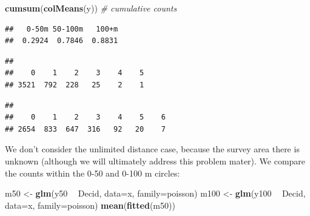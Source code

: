 \documentclass[12pt,]{book}
\newenvironment{Shaded}{\begin{snugshade}}{\end{snugshade}}
\newcommand{\CommentTok}[1]{\textcolor[rgb]{0.56,0.35,0.01}{\textit{#1}}}
\newcommand{\DataTypeTok}[1]{\textcolor[rgb]{0.13,0.29,0.53}{#1}}
\newcommand{\KeywordTok}[1]{\textcolor[rgb]{0.13,0.29,0.53}{\textbf{#1}}}
\newcommand{\NormalTok}[1]{#1}
\newcommand{\OperatorTok}[1]{\textcolor[rgb]{0.81,0.36,0.00}{\textbf{#1}}}
\newcommand{\StringTok}[1]{\textcolor[rgb]{0.31,0.60,0.02}{#1}}
\begin{document}
\begin{Shaded}
\begin{Highlighting}[]
\KeywordTok{cumsum}\NormalTok{(}\KeywordTok{colMeans}\NormalTok{(y)) }\CommentTok{# cumulative counts}
\end{Highlighting}
\end{Shaded}

\begin{verbatim}
##   0-50m 50-100m   100+m 
##  0.2924  0.7846  0.8831
\end{verbatim}

\begin{Shaded}
\end{Shaded}

\begin{verbatim}
## 
##    0    1    2    3    4    5 
## 3521  792  228   25    2    1
\end{verbatim}

\begin{Shaded}
\end{Shaded}

\begin{verbatim}
## 
##    0    1    2    3    4    5    6 
## 2654  833  647  316   92   20    7
\end{verbatim}

We don't consider the unlimited distance case, because the survey area there
is unknown (although we will ultimately address this problem mater).
We compare the counts within the 0-50 and 0-100 m circles:

\begin{Shaded}
\begin{Highlighting}[]
\NormalTok{m50 <-}\StringTok{ }\KeywordTok{glm}\NormalTok{(y50 }\OperatorTok{~}\StringTok{ }\NormalTok{Decid, }\DataTypeTok{data=}\NormalTok{x, }\DataTypeTok{family=}\NormalTok{poisson)}
\NormalTok{m100 <-}\StringTok{ }\KeywordTok{glm}\NormalTok{(y100 }\OperatorTok{~}\StringTok{ }\NormalTok{Decid, }\DataTypeTok{data=}\NormalTok{x, }\DataTypeTok{family=}\NormalTok{poisson)}
\KeywordTok{mean}\NormalTok{(}\KeywordTok{fitted}\NormalTok{(m50))}
\end{Highlighting}
\end{Shaded}
\end{document}
